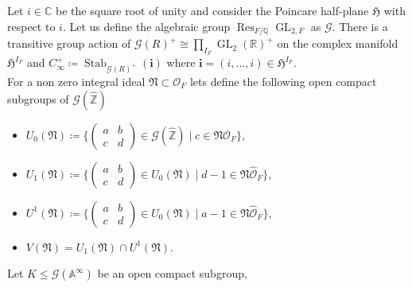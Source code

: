 \documentclass[10pt]{amsart}
\numberwithin{equation}{section}
\theoremstyle{definition}
\theoremstyle{remark} %
\newcommand{\cal}{\mathcal}
\newcommand{\GL}[1]{\operatorname{GL}_{#1}}
\newcommand{\Oo}{\mathcal{O}}
\newcommand{\Q}{\mathbb{Q}}
\newcommand{\Z}{\mathbb{Z}}
\begin{document}
	
	Let $ i \in \mathbb{C} $ be the square root of unity and consider the Poincare half-plane $ \mathfrak{H} $ with respect to $ i $. Let us define the algebraic group $ \operatorname{Res}_{F/\Q}\GL{2,F} $ as $ \cal G $.  There is a transitive group action of $\cal G(R)^+ \cong \prod_{I_F} \GL{2} (\mathbb{R})^+ $ on the complex manifold $ \mathfrak{H}^{I_F} $ and $ C_\infty^+ \coloneqq \operatorname{Stab}_{\cal G(R)^+}(\mathbf{i}) $ where $ \mathbf{i} = (i,...,i) \in \mathfrak{H}^{I_F}$.  \\
	For a non zero integral ideal $ \mathfrak{N} \subset \Oo_F $ lets define the following open compact subgroups of $ \cal G(\widehat{\Z}) $
	\begin{itemize}
		\item $ U_0(\mathfrak{N}) \coloneqq \biggl\{ 
		\begin{pmatrix}
			a &b \\
			c &d
		\end{pmatrix}
		\in \cal G(\widehat{\Z}) \mid c \in \mathfrak{N}\widehat{\Oo}_F
		\biggl\} $,
		\item $ U_1(\mathfrak{N}) \coloneqq \biggl\{ 
		\begin{pmatrix}
			a &b \\
			c &d
		\end{pmatrix}
		\in U_0(\mathfrak{N}) \mid d-1 \in \mathfrak{N}\widehat{\Oo}_F
		\biggl\} $,
		\item $ U^1(\mathfrak{N}) \coloneqq \biggl\{ 
		\begin{pmatrix}
			a &b \\
			c &d
		\end{pmatrix}
		\in U_0(\mathfrak{N}) \mid a-1 \in \mathfrak{N}\widehat{\Oo}_F
		\biggl\} $,
		\item $V(\mathfrak{N})=U_1(\mathfrak{N})\cap U^1(\mathfrak{N})$.
	\end{itemize}
	Let $ K \le \cal G(\mathbb{A}^\infty) $ be an open compact subgroup,
\end{document}
